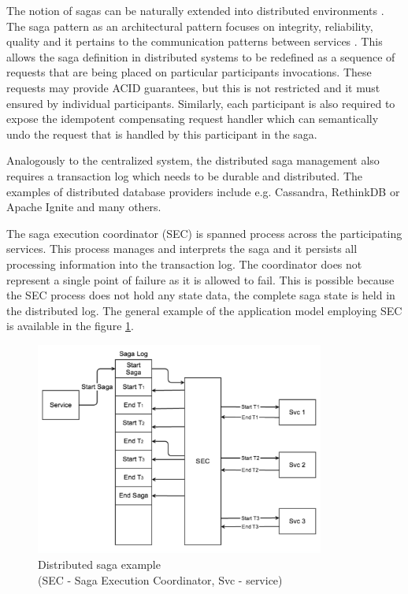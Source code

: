 \documentclass[oneside,
  digital, %
  table,   %
  lof,     %
  lot,     %
]{fithesis3}
\begin{document}
The notion of sagas can be naturally extended into distributed environments \cite{sagas_publ}. The saga pattern as an architectural pattern focuses on integrity, reliability, quality and it pertains to the communication patterns between services \cite{prac_ms}. This allows the saga definition in distributed systems to be redefined as a sequence of requests that are being placed on particular participants invocations. These requests may provide ACID guarantees, but this is not restricted and it must ensured by individual participants. Similarly, each participant is also required to expose the idempotent compensating request handler which can semantically undo the request that is handled by this participant in the saga.

Analogously to the centralized system, the distributed saga management also requires a transaction log which needs to be durable and distributed. The examples of distributed database providers include e.g. Cassandra, RethinkDB or Apache Ignite and many others.

The saga execution coordinator (SEC) is spanned process across the participating services. This process manages and interprets the saga and it persists all processing information into the transaction log. The coordinator does not represent a single point of failure as it is allowed to fail. This is possible because the SEC process does not hold any state data, the complete saga state is held in the distributed log. The general example of the application model employing SEC is available in the figure \ref{fig:SEC}.

\begin{figure}
    \begin{center}
        \includegraphics[height=70mm]{images/SEC.png}
    \end{center}
    \captionsetup{justification=centering}
    \caption{Distributed saga example \cite{applying_saga_pattern}\\ (SEC - Saga Execution Coordinator, Svc - service)}
    \label{fig:SEC}
\end{figure}
\end{document}
